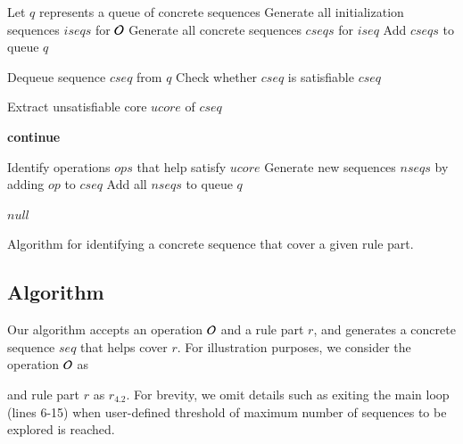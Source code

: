 \begin{algorithm}[t]
\footnotesize
\SetAlgoVlined
{}
\BlankLine

\nl Let $q$ represents a queue of concrete sequences\;
\nl Generate all initialization sequences $iseqs$ for ${\cal O}$\;
\nl {}
{
		\nl Generate all concrete sequences $cseqs$ for $iseq$\;
		\nl Add $cseqs$ to queue $q$\;
} 

\nl {}
{
		\nl Dequeue sequence $cseq$ from $q$\;
		\nl Check whether $cseq$ is satisfiable\;
		\nl {}
		{
				\Return $cseq$\;
		}
		
		\nl Extract unsatisfiable core $ucore$ of $cseq$\;
		
		\nl {}
		{
				{\bf continue}\;
		}
		
		\nl Identify operations $ops$ that help satisfy $ucore$\;		
		\nl {}
		{
			\nl Generate new sequences $nseqs$ by adding $op$ to $cseq$\;
			\nl Add all $nseqs$ to queue $q$\;
		}
}

\Return $null$\;
		
\caption{\label{alg:guidedsearch} Algorithm for
  identifying a concrete sequence that cover a given rule part.}
\end{algorithm}

\subsection{Algorithm}
\label{sec:technique}

Our algorithm accepts an operation ${\cal O}$ and a rule part $r$, and
generates a concrete sequence $seq$ that helps cover $r$. For illustration
purposes, we consider the operation ${\cal O}$ as \subject{GenerateInvoice} and 
rule part $r$ as $r_{4.2}$. For brevity,
we omit details such as exiting the main loop (lines 6-15) when user-defined
threshold of maximum number of sequences to be explored is reached.

